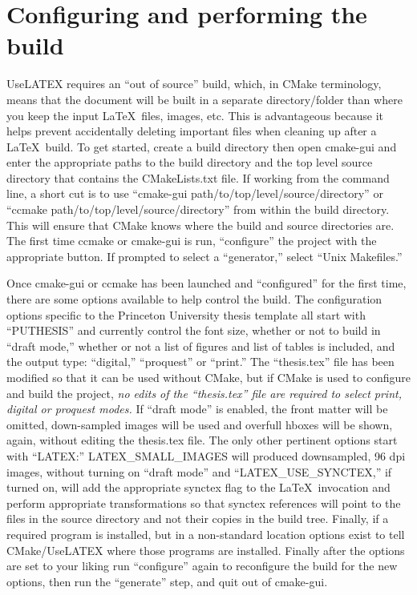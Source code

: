 \section{Configuring and performing the build}
\label{sec:building:configuring}

UseLATEX requires an ``out of source'' build, which, in CMake
terminology, means that the document will be built in a separate
directory/folder than where you keep the input \LaTeX\  files, images,
etc. This is advantageous because it helps prevent accidentally
deleting important files when cleaning up after a \LaTeX\  build. To get
started, create a build directory then open cmake-gui and enter the
appropriate paths to the build directory and the top level source
directory that contains the CMakeLists.txt file. If working from the
command line, a short cut is to use
``cmake-gui path/to/top/level/source/directory'' or
``ccmake path/to/top/level/source/directory'' from within the build
directory. This will ensure that CMake knows where the build and
source directories are. The first time ccmake or cmake-gui is run,
``configure'' the project with the appropriate button. If prompted to
select a ``generator,'' select ``Unix Makefiles.''

Once cmake-gui or ccmake has been launched and ``configured'' for the
first time, there are some options available to help control the
build. The configuration options specific to the Princeton University
thesis template all start with ``PUTHESIS'' and currently control the
font size, whether or not to build in ``draft mode,'' whether or not a
list of figures and list of tables is included, and the output type:
``digital,'' ``proquest'' or ``print.'' The ``thesis.tex'' file has
been modified so that it can be used without CMake, but if CMake is
used to configure and build the project, \emph{no edits of the
  ``thesis.tex'' file are required to select print, digital or
  proquest modes.} If ``draft mode'' is enabled, the front matter will
be omitted, down-sampled images will be used and overfull hboxes will
be shown, again, without editing the thesis.tex file. The only other
pertinent options start with ``LATEX:'' LATEX\_SMALL\_IMAGES will
produced downsampled, 96 dpi images, without turning on ``draft mode''
and ``LATEX\_USE\_SYNCTEX,'' if turned on, will add the appropriate
synctex flag to the \LaTeX\  invocation and perform appropriate
transformations so that synctex references will point to the files in
the source directory and not their copies in the build tree. Finally,
if a required program is installed, but in a non-standard location
options exist to tell CMake/UseLATEX where those programs are
installed. Finally after the options are set to your liking run
``configure'' again to reconfigure the build for the new options, then
run the ``generate'' step, and quit out of cmake-gui.


